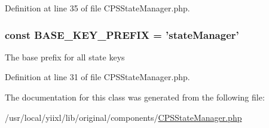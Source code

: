 Definition at line 35 of file CPSStateManager.php.

\hypertarget{classCPSStateManager_a0ab4998637c35aaf21bf01bb642b6e41}{
\subsubsection[{BASE\_\-KEY\_\-PREFIX}]{\setlength{\rightskip}{0pt plus 5cm}const {\bf BASE\_\-KEY\_\-PREFIX} = 'stateManager'}}
\label{classCPSStateManager_a0ab4998637c35aaf21bf01bb642b6e41}
The base prefix for all state keys 

Definition at line 31 of file CPSStateManager.php.



The documentation for this class was generated from the following file:\begin{DoxyCompactItemize}
\item 
/usr/local/yiixl/lib/original/components/\hyperlink{CPSStateManager_8php}{CPSStateManager.php}\end{DoxyCompactItemize}
